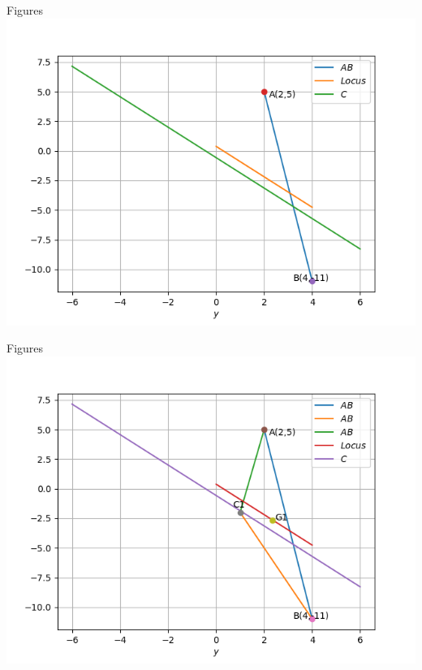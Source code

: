 \documentclass{beamer}
\begin{document}
\begin{frame}{Figures}
\includegraphics[scale = 0.6]{locus.png}
\end{frame}
\begin{frame}{Figures}
\includegraphics[scale = 0.6]{triangle.png}
\end{frame}
\end{document}
